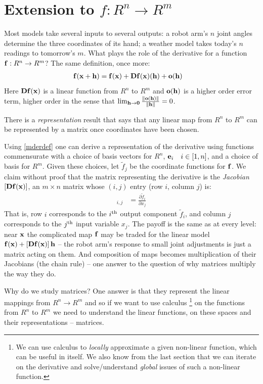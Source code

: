 \documentclass{article}
\begin{document}
\section{Extension to $f:R^n \rightarrow R^m$}
Most models take several inputs to several outputs: a robot arm's $n$
joint angles determine the three coordinates of its hand; a weather model
takes today's $n$ readings to tomorrow's $m$. What plays the role of the
derivative for a function ${\bf f}: R^n \rightarrow R^m$? The same
definition, once more:
\begin{align}
  {\bf f}({\bf x} + {\bf h}) &= {\bf f}({\bf x}) + {\bf Df}({\bf x})({\bf h})
  + {\bf o}({\bf h}) \label{mderdef}
\end{align}
Here ${\bf Df}({\bf x})$ is a linear function from $R^n$ to $R^m$ and
${\bf o}({\bf h})$ is a higher order error term, higher order in the sense that
$\lim_{{\bf h} \rightarrow {\bf 0}}\frac{\|{\bf o}({\bf h})\|}{\|{\bf h}\|} = 0$.

There is a {\em representation\/} result that says that any linear map from $R^n$ to $R^m$ can
be represented by a matrix once coordinates have been chosen.

Using \eqref{mderdef} one can derive a representation of the derivative 
using functions 
commensurate with a choice of basis vectors for $R^n$, ${\bf e}_i \quad i \in [1, n]$,
and a choice of basis for $R^m$. Given
these choices, let ${\tilde f}_j$ be the coordinate functions for ${\bf f}$.
We claim without proof that the matrix representing the derivative is the
{\em Jacobian\/} $[{\bf Df}({\bf x})]$, an $m \times n$ matrix whose
$(i, j)$ entry (row $i$, column $j$) is:
\begin{align}
  [{\bf Df}({\bf x})]_{i,j} &= \frac{\partial {\tilde f}_i}{\partial x_j}
\end{align}
That is, row $i$ corresponds to the $i^{\rm th}$ output component
$\tilde f_i$, and column $j$ corresponds to the $j^{\rm th}$ input variable
$x_j$. The payoff is the same as at every level: near ${\bf x}$ the
complicated map ${\bf f}$ may be traded for the linear model
${\bf f}({\bf x}) + [{\bf Df}({\bf x})]\,{\bf h}$ -- the robot arm's
response to small joint adjustments is just a matrix acting on them. And
composition of maps becomes multiplication of their Jacobians (the chain
rule) -- one answer to the question of why matrices multiply the way they
do.

Why do we study matrices? One answer is that they represent the linear mappings
from $R^n \rightarrow R^m$ and so if we want to use calculus%
\footnote{We can use calculus to {\em locally\/} approximate a given non-linear function,
which can be useful in itself. We also know from the last section that we can 
iterate on the derivative and solve/understand {\em global\/} issues of such a non-linear function.}
on the functions
from $R^n$ to $R^m$ we need to understand the linear functions, on these
spaces and their representations -- matrices.
\end{document}
